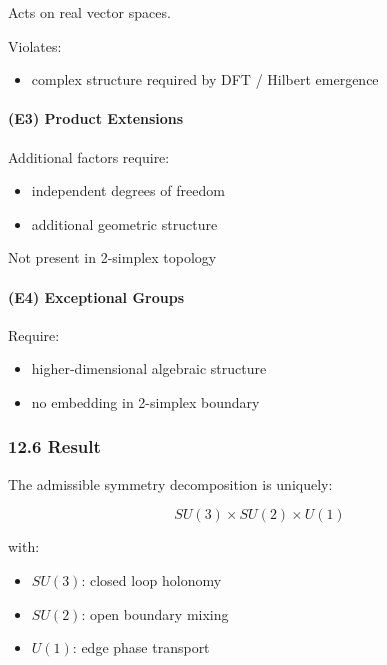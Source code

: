 \documentclass[
]{article}
\providecommand{\tightlist}{%
  \setlength{\itemsep}{0pt}\setlength{\parskip}{0pt}}
\begin{document}
Acts on real vector spaces.

Violates:

\begin{itemize}
\tightlist
\item
  complex structure required by DFT / Hilbert emergence
\end{itemize}

\hypertarget{e3-product-extensions}{%
\paragraph{(E3) Product Extensions}\label{e3-product-extensions}}

Additional factors require:

\begin{itemize}
\tightlist
\item
  independent degrees of freedom
\item
  additional geometric structure
\end{itemize}

Not present in 2-simplex topology

\hypertarget{e4-exceptional-groups}{%
\paragraph{(E4) Exceptional Groups}\label{e4-exceptional-groups}}

Require:

\begin{itemize}
\tightlist
\item
  higher-dimensional algebraic structure
\item
  no embedding in 2-simplex boundary
\end{itemize}

\hypertarget{result-1}{%
\subsubsection{12.6 Result}\label{result-1}}

The admissible symmetry decomposition is uniquely:

\[
SU(3) \times SU(2) \times U(1)
\]

with:

\begin{itemize}
\tightlist
\item
  \(SU(3)\): closed loop holonomy
\item
  \(SU(2)\): open boundary mixing
\item
  \(U(1)\): edge phase transport
\end{itemize}
\end{document}

